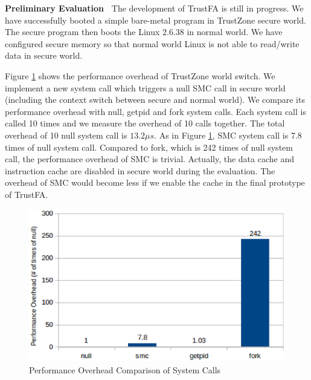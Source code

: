 \noindent
{\bf Preliminary Evaluation~}
The development of TrustFA is still in progress. We have successfully booted a
simple bare-metal program in TrustZone secure world. The secure program then
boots the Linux 2.6.38 in normal world. We have configured secure memory so that
normal world Linux is not able to read/write data in secure world.

Figure \ref{fig:syscall} shows the performance overhead of TrustZone world
switch.  We implement a new system call which triggers a null SMC call in secure
world (including the context switch between secure and normal world). We compare
its performance overhead with null, getpid and fork system calls. Each system
call is called 10 times and we measure the overhead of 10 calls together. The
total overhead of 10 null system call is $13.2\mu s$. As in Figure
\ref{fig:syscall}, SMC system call is 7.8 times of null system call.  Compared
to fork, which is 242 times of null system call, the performance overhead of SMC
is trivial. Actually, the data cache and instruction cache are disabled in
secure world during the evaluation. The overhead of SMC would become
less if we enable the cache in the final prototype of TrustFA.

\begin{figure}[htb]
	\centering
	\includegraphics[width=1.0\columnwidth]{figures/syscall.eps}
	\caption{Performance Overhead Comparison of System Calls}
	\label{fig:syscall}
\end{figure}

